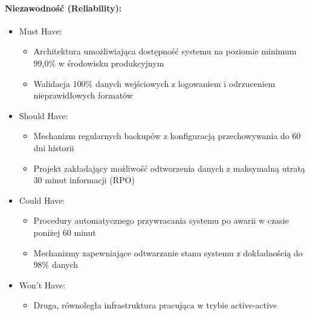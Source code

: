 \documentclass[12pt,a4paper,polish]{article}
\begin{document}
\paragraph{Niezawodność (Reliability):}
\begin{itemize}
	\item Must Have:
	      \begin{itemize}
		      \item Architektura umożliwiająca dostępność systemu na poziomie minimum 99,0\% w środowisku produkcyjnym
		      \item Walidacja 100\% danych wejściowych z logowaniem i odrzuceniem nieprawidłowych formatów
	      \end{itemize}
	\item Should Have:
	      \begin{itemize}
		      \item Mechanizm regularnych backupów z konfiguracją przechowywania do 60 dni historii
		      \item Projekt zakładający możliwość odtworzenia danych z maksymalną utratą 30 minut informacji (RPO)
	      \end{itemize}
	\item Could Have:
	      \begin{itemize}
		      \item Procedury automatycznego przywracania systemu po awarii w czasie poniżej 60 minut
		      \item Mechanizmy zapewniające odtwarzanie stanu systemu z dokładnością do 98\% danych
	      \end{itemize}
	\item Won't Have:
	      \begin{itemize}
		      \item Druga, równoległa infrastruktura pracująca w trybie active-active
	      \end{itemize}
\end{itemize}
\end{document}
